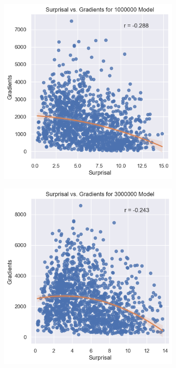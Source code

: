 \documentclass{IEEEtran}
\begin{document}
\begin{figure}[h]
    \centering
    \begin{subfigure}{0.4\textwidth}
        \centering
        \includegraphics[width=\textwidth]{surprisal_vs_gradients/1000000.png}
    \end{subfigure}
    \begin{subfigure}{0.4\textwidth}
        \centering
        \includegraphics[width=\textwidth]{surprisal_vs_gradients/3000000.png}
    \end{subfigure}
\end{figure}
\end{document}
